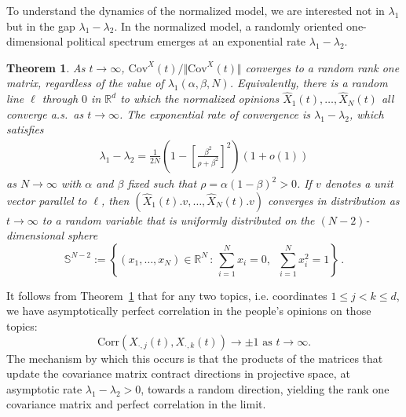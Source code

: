 \documentclass[12pt]{article}
\newtheorem{theorem}{Theorem}
\newcommand{\Cov}{\mathrm{Cov}}
\newcommand{\1}{\mathbf{1}}
\begin{document}
To understand the dynamics of the normalized model, we are interested not in $\lambda_1$ but in the gap $\lambda_1 - \lambda_2$. In the normalized model, a randomly oriented one-dimensional political spectrum emerges at an exponential rate $\lambda_1 - \lambda_2$.

\begin{theorem}\label{t3}
As $t\to\infty$, $\Cov^X(t)/\Vert \Cov^X(t)\Vert$ converges to a random rank one matrix, regardless of the value of  $\lambda_1(\alpha, \beta, N)$. Equivalently, there is a random line $\ell$ through $0$ in $\mathbb{R}^d$ to which the normalized opinions $\hat{X}_1(t), \dots, \hat{X}_N(t)$ all converge a.s.~as $t \to \infty$. The exponential rate of convergence is $\lambda_1 - \lambda_2$, which satisfies
\begin{align}\label{eq:t3}
\lambda_1-\lambda_2 = \frac1{2N}
\left(1-\left[\frac{\beta^2}{\rho+\beta^2}\right]^2\right)(1+o(1))
\end{align}
as $N \to \infty$ with $\alpha$ and $\beta$ fixed such that $\rho = \alpha(1-\beta)^2 > 0$.
If $v$ denotes a unit vector parallel to $\ell$, then $(\hat{X}_1(t).v, \dots, \hat{X}_N(t).v)$ converges in distribution as $t \to \infty$ to a random variable that is uniformly distributed on the $(N-2)$-dimensional sphere 
$$ \mathbb{S}^{N-2} := \left\{ (x_1, \dots, x_N) \in \mathbb{R}^N \,:\, \sum_{i=1}^N x_i = 0,\;\;\sum_{i=1}^N x_i^2 = 1 \right\}\,.$$
\end{theorem}

{
 It follows from Theorem~\ref{t3} that for any two topics, i.e. coordinates $1 \le j < k  \le d$, we have asymptotically perfect correlation in the people's opinions on those topics:
 \[\mathrm{Corr}(X_{\cdot,j}(t), X_{\cdot,k}(t)) \to \pm 1 \text{ as $t \to \infty$}.\]
The mechanism by which this occurs is that the products of the matrices that update the covariance matrix contract directions in projective space, at asymptotic rate $\lambda_1 - \lambda_2 > 0$, towards a random direction, yielding the rank one covariance matrix and perfect correlation in the limit.
}
\end{document}
